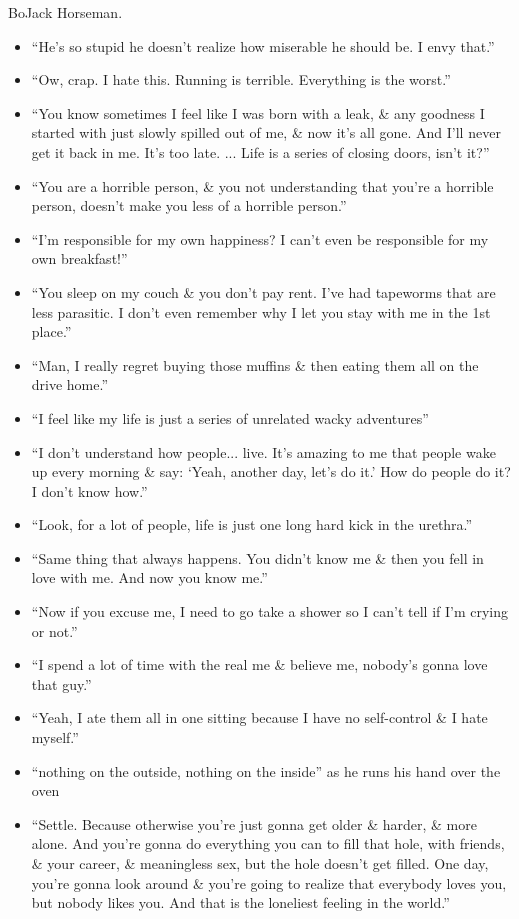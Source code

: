 \documentclass{article}
\begin{document}
\begin{enumerate}
    {\sf BoJack Horseman.}
    \begin{itemize}
    	\item ``He's so stupid he doesn't realize how miserable he should be. I envy that.''
    	\item ``Ow, crap. I hate this. Running is terrible. Everything is the worst.''
    	\item ``You know sometimes I feel like I was born with a leak, \& any goodness I started with just slowly spilled out of me, \& now it's all gone. And I'll never get it back in me. It's too late. ... Life is a series of closing doors, isn't it?''
    	\item``You are a horrible person, \& you not understanding that you're a horrible person, doesn't make you less of a horrible person.''
    	\item ``I'm responsible for my own happiness? I can't even be responsible for my own breakfast!''
    	\item ``You sleep on my couch \& you don't pay rent. I've had tapeworms that are less parasitic. I don't even remember why I let you stay with me in the 1st place.''
    	\item ``Man, I really regret buying those muffins \& then eating them all on the drive home.''
    	\item ``I feel like my life is just a series of unrelated wacky adventures''
    	\item ``I don't understand how people... live. It's amazing to me that people wake up every morning \& say: `Yeah, another day, let's do it.' How do people do it? I don't know how.''
    	\item ``Look, for a lot of people, life is just one long hard kick in the urethra.''
    	\item ``Same thing that always happens. You didn't know me \& then you fell in love with me. And now you know me.''
    	\item ``Now if you excuse me, I need to go take a shower so I can't tell if I'm crying or not.''
    	\item ``I spend a lot of time with the real me \& believe me, nobody's gonna love that guy.''
    	\item ``Yeah, I ate them all in one sitting because I have no self-control \& I hate myself.''
    	\item ``nothing on the outside, nothing on the inside'' as he runs his hand over the oven
    	\item ``Settle. Because otherwise you're just gonna get older \& harder, \& more alone. And you're gonna do everything you can to fill that hole, with friends, \& your career, \& meaningless sex, but the hole doesn't get filled. One day, you're gonna look around \& you're going to realize that everybody loves you, but nobody likes you. And that is the loneliest feeling in the world.''

\end{itemize}
\end{enumerate}
\end{document}
